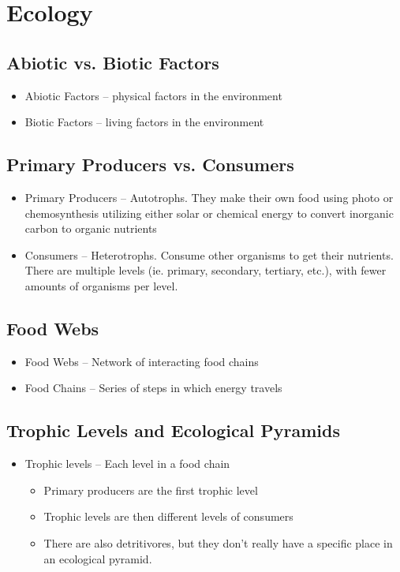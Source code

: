 \documentclass{article}
\begin{document}
\section{Ecology}

\subsection{Abiotic vs. Biotic Factors}
\begin{itemize}
\item Abiotic Factors -- physical factors in the environment
\item Biotic  Factors -- living factors in the environment
\end{itemize}

\subsection{Primary Producers vs. Consumers}
\begin{itemize}
\item Primary Producers -- Autotrophs. They make their own food using photo or chemosynthesis utilizing either solar or chemical energy to convert inorganic carbon to organic nutrients
\item Consumers -- Heterotrophs. Consume other organisms to get their nutrients. There are multiple levels (ie. primary, secondary, tertiary, etc.), with fewer amounts of organisms per level.
\end{itemize}

\subsection{Food Webs}
\begin{itemize}
\item Food Webs -- Network of interacting food chains
\item Food Chains -- Series of steps in which energy travels
\end{itemize}

\subsection{Trophic Levels and Ecological Pyramids}
\begin{itemize}
\item Trophic levels -- Each level in a food chain
\begin{itemize}
\item Primary producers are the first trophic level
\item Trophic levels are then different levels of consumers
\item There are also detritivores, but they don't really have a specific place in an ecological pyramid.
\end{itemize}
\end{itemize}
\end{document}
